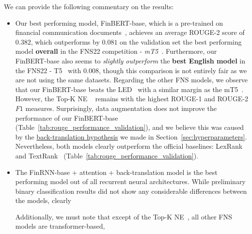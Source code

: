 We can provide the following commentary on the results:
\begin{itemize}
    \item Our best performing model, FinBERT-base, which is a pre-trained on financial communication documents~\cite{yang2020finbert},
        achieves an average ROUGE-2 score of $0.382$, which outperforms by $0.081$ on the validation set the best performing
        model \textbf{overall} in the FNS22 competition - \emph{mT5}~\cite{foroutan-etal-2022-multilingual}.
        Furthermore, our FinBERT-base also seems to \emph{slightly outperform} the \textbf{best English model} in the FNS22 - T5~\cite{el-haj-etal-2022-financial} with $0.008$,
        though this comparison is not entirely fair as we are not using the same datasets.
        Regarding the other FNS models, we observe that our FinBERT-base beats the LED~\cite{khanna-etal-2022-transformer} with a similar margin as the mT5~\cite{foroutan-etal-2022-multilingual}.
        However, the Top-K NE ~\cite{shukla-etal-2022-dimsum} remains with the highest ROUGE-1 and ROUGE-2 $F1$ measures.
        Surprisingly, data augmentation does not improve the performance of our FinBERT-base (Table~\ref{tab:rouge_performance_validation}), and we believe this was caused by
        the \hyperlink{data_augment_hypothesis}{back-translation hypothesis} we made in Section~\ref{sec:hyperparameters}.
        Nevertheless, both models clearly outperform the official baselines: LexRank~\cite{Erkan2004LexRankGC} and TextRank~\cite{mihalcea-tarau-2004-textrank} (Table~\ref{tab:rouge_performance_validation}).
    \item The FinRNN-base + attention + back-translation model is the best performing model out of all recurrent neural architectures.
    While preliminary binary classification results did not show any considerable differences between the models, clearly
    Additionally, we must note that except of the Top-K NE~\cite{shukla-etal-2022-dimsum}, all other FNS models are transformer-based,

\end{itemize}
